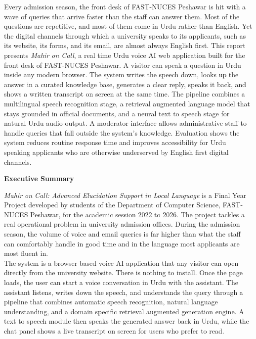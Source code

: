 \documentclass[12pt,a4paper]{report}
\begin{document}
\noindent Every admission season, the front desk of FAST-NUCES Peshawar is
hit with a wave of queries that arrive faster than the staff can answer them.
Most of the questions are repetitive, and most of them come in Urdu rather
than English. Yet the digital channels through which a university speaks to
its applicants, such as its website, its forms, and its email, are almost
always English first. This report presents \textit{Mahir on Call}, a real
time Urdu voice AI web application built for the front desk of FAST-NUCES
Peshawar. A visitor can speak a question in Urdu inside any modern browser.
The system writes the speech down, looks up the answer in a curated knowledge
base, generates a clear reply, speaks it back, and shows a written transcript
on screen at the same time. The pipeline combines a multilingual speech
recognition stage, a retrieval augmented language model that stays grounded
in official documents, and a neural text to speech stage for natural Urdu
audio output. A moderator interface allows administrative staff to handle
queries that fall outside the system's knowledge. Evaluation shows the
system reduces routine response time and improves accessibility for Urdu
speaking applicants who are otherwise underserved by English first digital
channels.

\newpage
\thispagestyle{plain}
\begin{center}
  {\Large \textbf{Executive Summary}}\\[1cm]
\end{center}

\noindent \textit{Mahir on Call: Advanced Elucidation Support in Local
Language} is a Final Year Project developed by students of the Department of
Computer Science, FAST-NUCES Peshawar, for the academic session 2022 to
2026. The project tackles a real operational problem in university admission
offices. During the admission season, the volume of voice and email queries
is far higher than what the staff can comfortably handle in good time and in
the language most applicants are most fluent in.\\[0.3cm]

\noindent The system is a browser based voice AI application that any
visitor can open directly from the university website. There is nothing to
install. Once the page loads, the user can start a voice conversation in
Urdu with the assistant. The assistant listens, writes down the speech, and
understands the query through a pipeline that combines automatic speech
recognition, natural language understanding, and a domain specific retrieval
augmented generation engine. A text to speech module then speaks the
generated answer back in Urdu, while the chat panel shows a live transcript
on screen for users who prefer to read.\\[0.3cm]
\end{document}
